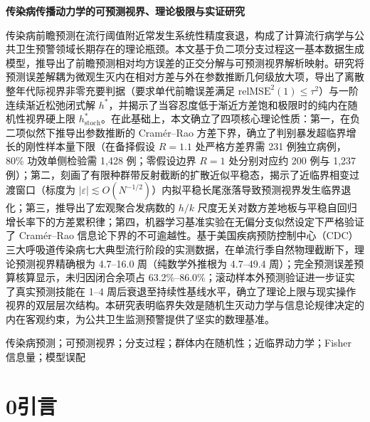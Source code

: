 \documentclass[11pt,a4paper]{article}
\theoremstyle{plain}
\theoremstyle{definition}
\begin{document}
\begin{center}
    \vspace*{0.5em}
    {\heiti\bfseries 传染病传播动力学的可预测视界、理论极限与实证研究} \\[1.8em]
\end{center}

传染病前瞻预测在流行阈值附近常发生系统性精度衰退，构成了计算流行病学与公共卫生预警领域长期存在的理论瓶颈。本文基于负二项分支过程这一基本数据生成模型，推导出了前瞻预测相对均方误差的正交分解与可预测视界解析映射。研究将预测误差解耦为微观生灭内在相对方差与外在参数推断几何级放大项，导出了离散整年代际视界非零充要判据（要求单代前瞻误差满足 $\text{relMSE}^2(1) \le \tau^2$）与一阶连续渐近松弛闭式解 $h^*$，并揭示了当容忍度低于渐近方差饱和极限时的纯内在随机性视界硬上限 $h^*_{\text{stoch}}$。在此基础上，本文确立了四项核心理论性质：第一，在负二项似然下推导出参数推断的 Cram\'er--Rao 方差下界，确立了判别暴发超临界增长的刚性样本量下限（在备择假设 $R=1.1$ 处严格方差界需 231 例独立病例，80\% 功效单侧检验需 1,428 例；零假设边界 $R=1$ 处分别对应约 200 例与 1,237 例）；第二，刻画了有限种群带反射截断的扩散近似平稳态，揭示了近临界相变过渡窗口（标度为 $|\varepsilon| \lesssim O(N^{-1/2})$）内拟平稳长尾涨落导致预测视界发生临界退化；第三，推导出了宏观聚合发病数的 $h/k$ 尺度无关对数方差地板与平稳自回归增长率下的方差累积律；第四，机器学习基准实验在无偏分支似然设定下严格验证了 Cram\'er--Rao 信息论下界的不可逾越性。基于美国疾病预防控制中心（CDC）三大呼吸道传染病七大典型流行阶段的实测数据，在单流行季自然物理截断下，理论预测视界精确根为 4.7--16.0 周（纯数学外推根为 4.7--49.4 周）；完全预测误差预算核算显示，未归因闭合余项占 63.2\%--86.0\%；滚动样本外预测验证进一步证实了真实预测技能在 1--4 周后衰退至持续性基线水平，确立了理论上限与现实操作视界的双层层次结构。本研究表明临界失效是随机生灭动力学与信息论规律决定的内在客观约束，为公共卫生监测预警提供了坚实的数理基准。

\vspace{0.8em}
传染病预测；可预测视界；分支过程；群体内在随机性；近临界动力学；Fisher 信息量；模型误配

\vspace{1.5em}


\section*{0\quad 引言}
\end{document}

